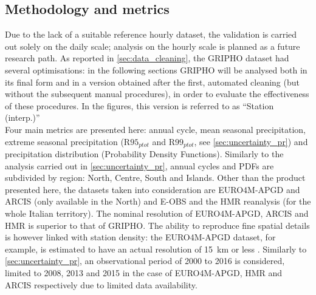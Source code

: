 \subsection{Methodology and metrics}
Due to the lack of a suitable reference hourly dataset, the validation is carried out solely on the daily scale; analysis on the hourly scale is planned as a future research path.
As reported in \cref{sec:data_cleaning}, the GRIPHO dataset had several optimisations: in the following sections GRIPHO will be analysed both in its final form and in a version obtained after the first, automated cleaning (but without the subsequent manual procedures), in order to evaluate the effectiveness of these procedures.
In the figures, this version is referred to as ``Station (interp.)''\\
Four main metrics are presented here: annual cycle, mean seasonal precipitation, extreme seasonal precipitation ($\textrm{R95}_{ptot}$ and $\textrm{R99}_{ptot}$, see \cref{sec:uncertainty_pr}) and precipitation distribution (Probability Density Functions). Similarly to the analysis carried out in \cref{sec:uncertainty_pr}, annual cycles and PDFs are subdivided by region: North, Centre, South and Islands. Other than the product presented here, the datasets taken into consideration are EURO4M-APGD and ARCIS (only available in the North) and E-OBS and the HMR reanalysis (for the whole Italian territory). The nominal resolution of EURO4M-APGD, ARCIS and HMR is superior to that of GRIPHO. The ability to reproduce fine spatial details is however linked with station density: the EURO4M-APGD dataset, for example, is estimated to have an actual resolution of \SI{15}{\kilo\metre} or less \citep{Isotta2014}.
Similarly to \cref{sec:uncertainty_pr}, an observational period of 2000 to 2016 is considered, limited to 2008, 2013 and 2015 in the case of EURO4M-APGD, HMR and ARCIS respectively due to limited data availability.

